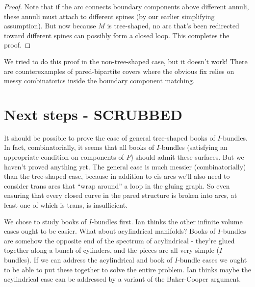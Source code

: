 \documentclass[12pt]{amsart}
\theoremstyle{definition}
\theoremstyle{remark}
\begin{document}
\begin{proof}
Note that if the arc connects boundary components above different annuli, these
annuli must attach to different spines (by our earlier simplifying assumption).
But now because $M$ is tree-shaped, no arc that's been redirected toward
different spines can possibly form a closed loop. This completes the proof.

\end{proof}

We tried to do this proof in the non-tree-shaped case, but it doesn't work!
There are counterexamples of pared-bipartite covers where the obvious fix
relies on messy combinatorics inside the boundary component matching.

\section{Next steps - SCRUBBED}

It should be possible to prove the case of general tree-shaped books of
$I$-bundles. In fact, combinatorially, it seems that all books of $I$-bundles
(satisfying an appropriate condition on components of $P$) should admit these
surfaces. But we haven't proved anything yet. The general case is much messier
(combinatorially) than the tree-shaped case, because in addition to cis arcs
we'll also need to consider trans arcs that ``wrap around'' a loop in the
gluing graph. So even ensuring that every closed curve in the pared structure
is broken into arcs, at least one of which is trans, is insufficient.

We chose to study books of $I$-bundles first. Ian thinks the other infinite
volume cases ought to be easier. What about acylindrical manifolds?  Books of
$I$-bundles are somehow the opposite end of the spectrum of acylindrical
- they're glued together along a bunch of cylinders, and the pieces are all
very simple ($I$-bundles).  If we can address the acylindrical and book of
$I$-bundle cases we ought to be able to put these together to solve the entire
problem. Ian thinks maybe the acylindrical case can be addressed by a variant
of the Baker-Cooper argument.



\end{document}
